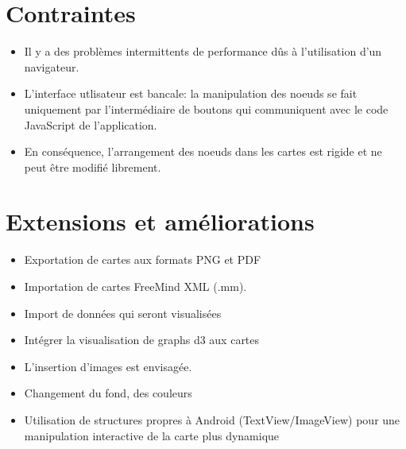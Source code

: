 \documentclass[11pt,a4paper,margin=0.5in]{report}
\begin{document}
\section{Contraintes}
\begin{itemize}
\item Il y a des problèmes intermittents de performance dûs à l'utilisation d'un navigateur.
\item L'interface utlisateur est bancale: la manipulation des noeuds se fait uniquement par l'intermédiaire de 
boutons qui communiquent avec le code JavaScript de l'application.
\item En conséquence, l'arrangement des noeuds dans les cartes est rigide et ne peut être modifié librement.
\end{itemize}

\section{Extensions et améliorations}

\begin{itemize}
\item Exportation de cartes aux formats PNG et PDF
\item Importation de cartes FreeMind XML (.mm).
\item Import de données qui seront visualisées
\item Intégrer la visualisation de graphs d3 aux cartes
\item L'insertion d'images est envisagée.
\item Changement du fond, des couleurs
\item Utilisation de structures propres à Android (TextView/ImageView) pour une manipulation interactive de la carte plus dynamique
\end{itemize}
\end{document}
